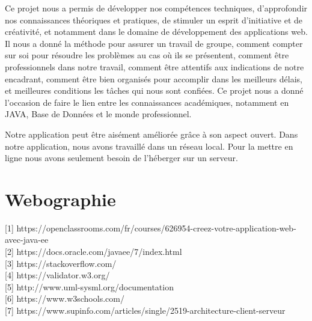 \documentclass[11.5pt]{report}
\begin{document}
Ce projet nous a permis de développer nos compétences techniques, d’approfondir nos connaissances théoriques et pratiques, de stimuler un esprit d’initiative et de créativité, et notamment dans le domaine de développement des applications web. Il nous a donné la méthode pour assurer un travail de groupe, comment compter sur soi pour résoudre les problèmes au cas où ils se présentent, comment être professionnels dans notre travail, comment être attentifs aux indications de notre encadrant, comment être bien organisés pour accomplir dans les meilleurs délais, et meilleures conditions les tâches qui nous sont confiées. Ce projet nous a donné l’occasion de faire le lien entre les connaissances académiques, notamment en JAVA, Base de Données et le monde professionnel.

Notre application peut être aisément améliorée grâce à son aspect ouvert. Dans notre application, nous avons travaillé dans un réseau local. Pour la mettre en ligne nous avons seulement besoin de l’héberger sur un serveur.
\chapter*{Webographie}
[1]   https://openclassrooms.com/fr/courses/626954-creez-votre-application-web-avec-java-ee\\

[2]     https://docs.oracle.com/javaee/7/index.html\\

[3]    https://stackoverflow.com/ \\

[4]    https://validator.w3.org/ \\

[5]   http://www.uml-sysml.org/documentation \\

[6]    https://www.w3schools.com/\\

[7]     https://www.supinfo.com/articles/single/2519-architecture-client-serveur \\  
\end{document}
